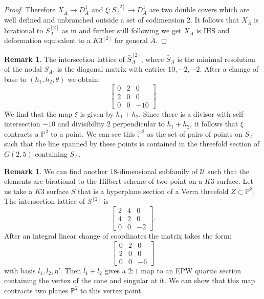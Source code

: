 \documentclass[a4paper,11pt]{amsart}
\theoremstyle{definition}
\newtheorem{rem}[thm]{Remark}
\numberwithin{equation}{section}
\numberwithin{equation}{section} \theoremstyle{definition}
\begin{document}
\begin{proof}
Therefore $X_{\bar{A}}\rightarrow D^1_{\bar{A}}$ and $\xi: S_A^{[2]} \rightarrow D^1_{\bar{A}}$ are two double covers which are well defined and unbranched outside a set of codimension 2. It follows that $X_{{\bar{A}}}$ is birational to $S_A^{[2]}$ as in \cite[\S 5]{EPWcubes} and further still following \cite[\S 5]{EPWcubes} we get $X_{{\bar{A}}}$ is IHS 
and deformation equivalent to a $K3^{[2]}$ for general ${\bar{A}}$. 
 \end{proof}
\begin{rem} The intersection lattice of $\bar{S}_A^{[2]}$, where $\bar{S}_A$ is the minimal resolution of the nodal $S_A$, is the diagonal matrix with entries $10,-2,-2$. After a change of base to $(h_1,h_2,\theta)$ we obtain:
$$\begin{bmatrix}0&2&0\\
2&0&0\\
0&0&-10
\end{bmatrix}$$
We find that the map $\xi$ is given by $h_1+h_2$. Since there is a divisor with self-intersection $-10$ and divisibility $2$ perpendicular to $h_1+h_2$, it follows that $\xi$ contracts a ${{\mathbb{P}}}^2$ to a point.
We can see this ${{\mathbb{P}}}^2$ as the set of pairs of points on $S_A$ such that the line spanned by these points is contained in the threefold section of $G(2,5)$ containing $S_A$.
\end{rem}
\begin{rem} We can find another $18$-dimensional subfamily of $\mathcal{U}$ such that the elements are birational to the Hilbert scheme of two point on a $K3$ surface.  
Let us take a $K3$ surface $S$ that is a hyperplane section of a Verra threefold $Z\subset {{\mathbb{P}}}^8$.
The intersection lattice of $S^{[2]}$ is 
$$\begin{bmatrix}2&4&0\\
4&2&0\\
0&0&-2
\end{bmatrix}.$$
After an integral linear change of coordinates the matrix takes the form:
$$\begin{bmatrix}0&2&0\\
2&0&0\\
0&0&-6
\end{bmatrix}$$
with basis $l_1,l_2,\eta'$.
Then $l_1+l_2$ gives a $2:1$ map to an EPW quartic section containing the vertex of the cone and singular at it. We can show that this map contracts two planes ${{\mathbb{P}}}^2$ to this vertex point.

\end{rem}
\end{document}
